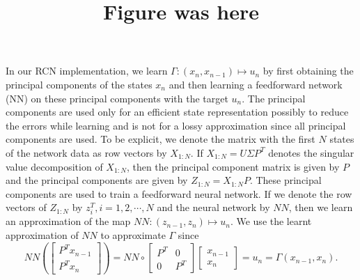 \documentclass[12 pt]{article}
\begin{document}
\title{Figure was here}






 
In our RCN implementation, we learn $\Gamma: (x_n,x_{n-1}) \mapsto u_n$ by first obtaining the principal components of the states $x_n$ and then 
learning a feedforward network (NN) on these principal components with the target $u_n$. The principal components are used only for an efficient state representation possibly to reduce the errors while learning and is not for a lossy approximation since all principal components are used.  To be explicit, we denote the matrix with the first $N$ states of the network data as row vectors by $X_{1:N}$. If $X_{1:N}=U\Sigma P^T$ denotes the singular value decomposition of $X_{1:N}$, then the principal component matrix is given by $P$ and the principal components are given by 
 $Z_{1:N}=X_{1:N}P.$
These principal components are used to train a feedforward neural network. If we denote the row vectors of $Z_{1:N}$ by 
$z_i^T, i=1,2,\cdots,N$ and the neural network by $NN$, then we learn an approximation of the map
$NN: (z_{n-1},z_n) \mapsto  u_n.
$
We use the learnt approximation of $NN$ to approximate $\Gamma$ since 
$$
NN\left( \begin{bmatrix} 
P^Tx_{n-1} \\
P^Tx_n
\end{bmatrix}
\right) = NN \circ 
\begin{bmatrix}
P^T & 0 \\
0 & P^T 
\end{bmatrix}\begin{bmatrix}
x_{n-1}\\
x_n
\end{bmatrix} = u_n = \Gamma(x_{n-1},x_n).
$$
\end{document}
